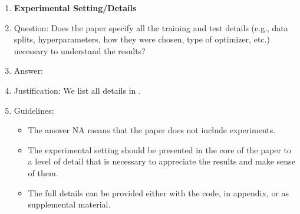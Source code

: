 \begin{enumerate}
\item {\bf Experimental Setting/Details}
\item[] Question: Does the paper specify all the training and test details (e.g., data splits, hyperparameters, how they were chosen, type of optimizer, etc.) necessary to understand the results?
\item[] Answer: \answerYes{}
\item[] Justification: We list all details in .
\item[] Guidelines:
  \begin{itemize}
  \item The answer NA means that the paper does not include experiments.
  \item The experimental setting should be presented in the core of the paper to a level of detail that is necessary to appreciate the results and make sense of them.
  \item The full details can be provided either with the code, in appendix, or as supplemental material.
  \end{itemize}


\end{enumerate}

